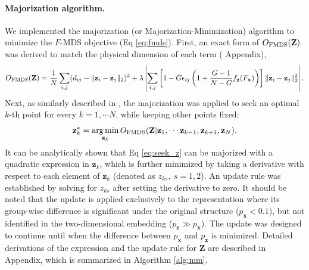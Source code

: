 \documentclass[10pt,letterpaper]{article}
\DeclareMathOperator*{\argmin}{arg\,min}
\newcommand{\1}{{\rm 1}\kern-0.24em{\rm I}}
\begin{document}
\paragraph*{Majorization algorithm.}
We implemented the majorization (or Majorization-Minimization) algorithm to minimize the $F$-MDS objective (Eq \ref{eq:fmds}). First, an exact form of $O_{\rm FMDS}(\mathbf{Z})$ was derived to match the physical dimension of each term ( Appendix),
\begin{equation}
    O_{\rm FMDS}(\mathbf{Z}) = \frac{1}{N}\sum_{i,j} (d_{ij} - \| \mathbf{z}_i - \mathbf{z}_j \|_2 )^2 + \lambda\left|\sum_{i,j} \left[1- G\epsilon_{ij} \left(1+\frac{G-1}{N-G}f_\mathbf{z}(F_\mathbf{x})\right)\right] \|\mathbf{z}_i - \mathbf{z}_j\|_2^2\right|.
\end{equation}
Next, as similarly described in \cite{borg05c, witten11}, the majorization was applied to seek an optimal $k$-th point for every $k=1,\cdots N$, while keeping other points fixed:
\begin{equation}
    \mathbf{z}_k^* = \argmin_{\mathbf{z}_k}O_{\rm FMDS}(\mathbf{Z} | \mathbf{z}_1,\cdots \mathbf{z}_{k-1}, \mathbf{z}_{k+1}, \mathbf{z}_N).
    \label{eq:seek_z}
\end{equation}
It can be analytically shown that Eq \ref{eq:seek_z} can be majorized with a quadratic expression in $\mathbf{z}_k$, which is further minimized by taking a derivative with respect to each element of $\mathbf{z}_k$ (denoted as ${z}_{ks},\ s=1,2$). An update rule was established by solving for ${z}_{ks}$ after setting the derivative to zero. It should be noted that the update is applied exclusively to the representation where its group-wise difference is significant under the original structure ($p_\mathbf{x} < 0.1$), but not identified in the two-dimensional embedding ($p_\mathbf{z}\gg p_\mathbf{x}$). The update was designed to continue until when the difference between $p_\mathbf{x}$ and $p_\mathbf{z}$ is minimized. Detailed derivations of the expression and the update rule for $\mathbf{Z}$ are described in  Appendix, which is summarized in Algorithm \ref{alg:mm}.
\end{document}
